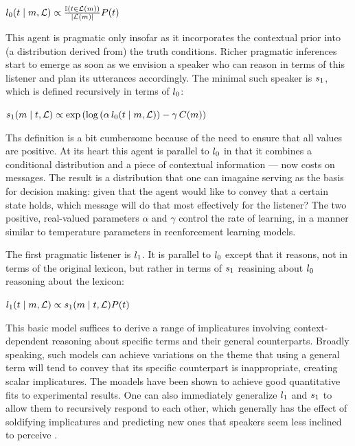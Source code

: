\documentclass{article}
\begin{document}
\begin{examples}
\item\label{l0}%
    $l_{0}(t \mid m, \mathcal{L}) \propto
    \frac{\mathbb{I}(t \in \mathcal{L}(m))}{|\mathcal{L}(m)|}
    P(t)$
\end{examples}

This agent is pragmatic only insofar as it incorporates the contextual 
prior into (a distribution derived from) the truth conditions. Richer
pragmatic inferences start to emerge as soon as we envision a speaker
who can reason in terms of this listener and plan its utterances 
accordingly. The minimal such speaker is $s_{1}$, which is 
defined recursively in terms of $l_{0}$:
%
\begin{examples}
  \item\label{s1}%
    $s_{1}(m \mid t, \mathcal{L}) \propto
    \exp
    \left(
      \log\left(\alpha\,l_{0}(t \mid m, \mathcal{L}) \right)
      - 
      \gamma\,C(m)
    \right)$
\end{examples}
%
Ths definition is a bit cumbersome because of the need to ensure that
all values are positive. At its heart this agent is parallel to
$l_{0}$ in that it combines a conditional distribution and a
piece of contextual information --- now costs on messages. The result
is a distribution that one can imagaine serving as the basis for
decision making: given that the agent would like to convey that a
certain state holds, which message will do that most effectively for
the listener? The two positive, real-valued parameters $\alpha$ and
$\gamma$ control the rate of learning, in a manner similar to
temperature parameters in reenforcement learning models.

The first pragmatic listener is $l_{1}$. It is parallel to
$l_{0}$ except that it reasons, not in terms of the original
lexicon, but rather in terms of $s_{1}$ reasining about
$l_{0}$ reasoning about the lexicon:
%
\begin{examples}
  \item\label{l1}%
    $l_{1}(t \mid m, \mathcal{L}) \propto 
    s_{1}(m \mid t, \mathcal{L})
    P(t)$
\end{examples}

This basic model suffices to derive a range of implicatures involving
context-dependent reasoning about specific terms and their general
counterparts. Broadly speaking, such models can achieve variations on
the theme that using a general term will tend to convey that its
specific counterpart is inappropriate, creating scalar implicatures.
The moadels have been shown to achieve good quantitative fits to
experimental results.  One can also immediately generalize
$l_{1}$ and $s_{1}$ to allow them to recursively respond
to each other, which generally has the effect of soldifying
implicatures and predicting new ones that speakers seem less inclined
to perceive \citep{Vogel-etal:2014}.
\end{document}

